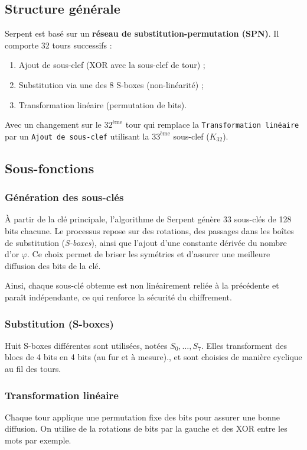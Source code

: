 \documentclass[12pt,a4paper]{report}
\begin{document}
\setcounter{subsection}{0}

\subsection{Structure générale}
Serpent est basé sur un \textbf{réseau de substitution-permutation (SPN)}.  
Il comporte 32 tours successifs :
\begin{enumerate}
    \item Ajout de sous-clef (XOR avec la sous-clef de tour) ;
    \item Substitution via une des 8 S-boxes (non-linéarité) ;
    \item Transformation linéaire (permutation de bits).
\end{enumerate}
Avec un changement sur le $32^{\text{ème}}$ tour qui remplace la \texttt{Transformation linéaire} par un \texttt{Ajout de sous-clef} utilisant la $33^{\text{ème}}$ sous-clef ($K_{32}$).

\subsection{Sous-fonctions}

\subsubsection{Génération des sous-clés}

À partir de la clé principale, l’algorithme de Serpent génère 33 sous-clés de 128 bits chacune.  
Le processus repose sur des rotations, des passages dans les boîtes de substitution (\textit{S-boxes}), ainsi que l’ajout d’une constante dérivée du nombre d’or \(\varphi\).  
Ce choix permet de briser les symétries et d’assurer une meilleure diffusion des bits de la clé.  

Ainsi, chaque sous-clé obtenue est non linéairement reliée à la précédente et paraît indépendante, ce qui renforce la sécurité du chiffrement.  

\subsubsection{Substitution (S-boxes)}
Huit S-boxes différentes sont utilisées, notées $S_0, \dots, S_7$.  
Elles transforment des blocs de 4 bits en 4 bits (au fur et à mesure)., et sont choisies de manière cyclique au fil des tours.

\subsubsection{Transformation linéaire}
Chaque tour applique une permutation fixe des bits pour assurer une bonne diffusion. On utilise de la rotations de bits par la gauche et des XOR entre les mots par exemple.
\end{document}
